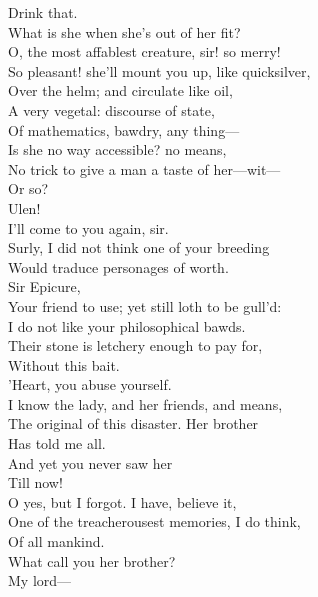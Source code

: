 \documentclass[a4paper,oneside]{memoir}
\begin{document}
\begin{drama*}
\mammonspeaks Drink that.\\
 What is she when she's out of her fit?\\
\facespeaks O, the most affablest creature, sir! so merry!\\
So pleasant! she'll mount you up, like quicksilver,\\
Over the helm; and circulate like oil,\\
A very vegetal: discourse of state,\\
Of mathematics, bawdry, any thing---\\
\mammonspeaks Is she no way accessible? no means,\\
No trick to give a man a taste of her---wit---\\
Or so?\\
\subtlespeaks {}  Ulen!\\
\facespeaks {} I'll come to you again, sir.\\
\mammonspeaks Surly, I did not think one of your breeding\\
Would traduce personages of worth.\\
\surlyspeaks {} Sir Epicure,\\
Your friend to use; yet still loth to be gull'd:\\
I do not like your philosophical bawds.\\
Their stone is letchery enough to pay for,\\
Without this bait.\\
\mammonspeaks {} 'Heart, you abuse yourself.\\
I know the lady, and her friends, and means,\\
The original of this disaster. Her brother\\
Has told me all.\\
\surlyspeaks {} And yet you never saw her\\
Till now!\\
\mammonspeaks {} O yes, but I forgot. I have, believe it,\\
One of the treacherousest memories, I do think,\\
Of all mankind.\\
\surlyspeaks {} What call you her brother?\\
\mammonspeaks {} My lord---\\

\end{drama*}
\end{document}
